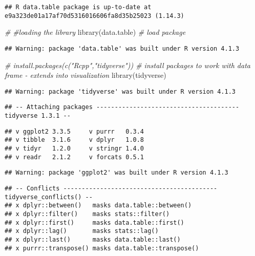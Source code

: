 \documentclass[
]{article}
\newenvironment{Shaded}{\begin{snugshade}}{\end{snugshade}}
\newcommand{\CommentTok}[1]{\textcolor[rgb]{0.56,0.35,0.01}{\textit{#1}}}
\newcommand{\FunctionTok}[1]{\textcolor[rgb]{0.00,0.00,0.00}{#1}}
\newcommand{\NormalTok}[1]{#1}
\begin{document}
\begin{verbatim}
## R data.table package is up-to-date at e9a323de01a17af70d5316016606fa8d35b25023 (1.14.3)
\end{verbatim}

\begin{Shaded}
\begin{Highlighting}[]
\CommentTok{\#}
\CommentTok{\#loading the library}
\FunctionTok{library}\NormalTok{(data.table) }\CommentTok{\# load package}
\end{Highlighting}
\end{Shaded}

\begin{verbatim}
## Warning: package 'data.table' was built under R version 4.1.3
\end{verbatim}

\begin{Shaded}
\begin{Highlighting}[]
\CommentTok{\# install.packages(c("Rcpp","tidyverse")) \# install packages to work with data frame {-} extends into visualization}
\FunctionTok{library}\NormalTok{(tidyverse)}
\end{Highlighting}
\end{Shaded}

\begin{verbatim}
## Warning: package 'tidyverse' was built under R version 4.1.3
\end{verbatim}

\begin{verbatim}
## -- Attaching packages --------------------------------------- tidyverse 1.3.1 --
\end{verbatim}

\begin{verbatim}
## v ggplot2 3.3.5     v purrr   0.3.4
## v tibble  3.1.6     v dplyr   1.0.8
## v tidyr   1.2.0     v stringr 1.4.0
## v readr   2.1.2     v forcats 0.5.1
\end{verbatim}

\begin{verbatim}
## Warning: package 'ggplot2' was built under R version 4.1.3
\end{verbatim}

\begin{verbatim}
## -- Conflicts ------------------------------------------ tidyverse_conflicts() --
## x dplyr::between()   masks data.table::between()
## x dplyr::filter()    masks stats::filter()
## x dplyr::first()     masks data.table::first()
## x dplyr::lag()       masks stats::lag()
## x dplyr::last()      masks data.table::last()
## x purrr::transpose() masks data.table::transpose()
\end{verbatim}
\end{document}
